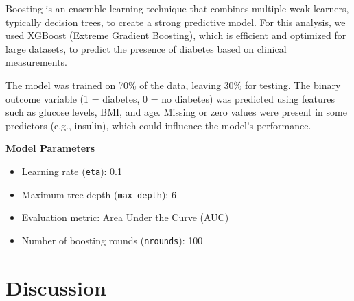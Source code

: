 \documentclass[12pt]{article}
\begin{document}
Boosting \cite{chen2015xgboost} \cite{friedman2001greedy} is an ensemble learning technique that combines multiple weak learners, typically decision trees, to create a strong predictive model. For this analysis, we used XGBoost (Extreme Gradient Boosting), which is efficient and optimized for large datasets, to predict the presence of diabetes based on clinical measurements.

The model was trained on 70\% of the data, leaving 30\% for testing. The binary outcome variable (1 = diabetes, 0 = no diabetes) was predicted using features such as glucose levels, BMI, and age. Missing or zero values were present in some predictors (e.g., insulin), which could influence the model's performance.

\textbf{Model Parameters}
\begin{itemize}
	\item Learning rate (\texttt{eta}): 0.1
	\item Maximum tree depth (\texttt{max\_depth}): 6
	\item Evaluation metric: Area Under the Curve (AUC)
	\item Number of boosting rounds (\texttt{nrounds}): 100
\end{itemize}

\section{Discussion}
\end{document}
